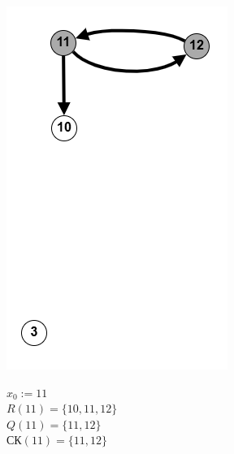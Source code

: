 \documentclass{article}
\begin{document}
\begin{enumerate}
\begin{figure}[ht]
\begin{subfigure}[t]{0.22\textwidth}
         \label{fig:1_3}
        \end{subfigure}
    \hfill
     \begin{subfigure}[t]{0.17\textwidth}
         \centering
         \caption*{\small{$x_0 := 11$\\
        $R(11)=\{10,11,12\}$\\$Q(11)=\{11,12\}$\\
        $\text{СК}(11) = \{11,12\}$}}
         \includegraphics[width=\textwidth]{attachments/1/sk-5.png}
         \label{fig:1_4}
        \end{subfigure}
    \hfill
     \begin{subfigure}[t]{0.13\textwidth}

\end{subfigure}
\end{figure}
\end{enumerate}
\end{document}
